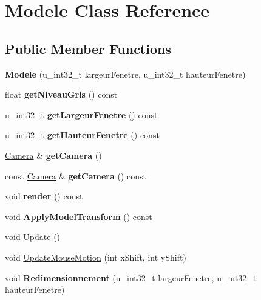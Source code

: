 \hypertarget{classModele}{}\section{Modele Class Reference}
\label{classModele}
\subsection*{Public Member Functions}
\begin{DoxyCompactItemize}
\item 
\mbox{\label{classModele_a0098c7c0f9a93ed57132232336464bd7}} 
{\bfseries Modele} (u\+\_\+int32\+\_\+t largeur\+Fenetre, u\+\_\+int32\+\_\+t hauteur\+Fenetre)
\item 
\mbox{\label{classModele_a3402dd74eb65094a7c9ebb3a47630726}} 
float {\bfseries get\+Niveau\+Gris} () const
\item 
\mbox{\label{classModele_a00323c7617ab598c5539fa11a67cc6f2}} 
u\+\_\+int32\+\_\+t {\bfseries get\+Largeur\+Fenetre} () const
\item 
\mbox{\label{classModele_a9187322e1192d147c2e5860c09a46202}} 
u\+\_\+int32\+\_\+t {\bfseries get\+Hauteur\+Fenetre} () const
\item 
\mbox{\label{classModele_ac5f88f777e3407f1e47d26836be6ab8f}} 
\mbox{\hyperlink{classCamera}{Camera}} \& {\bfseries get\+Camera} ()
\item 
\mbox{\label{classModele_af9d6fd80f9f4af067706997d1d14652d}} 
const \mbox{\hyperlink{classCamera}{Camera}} \& {\bfseries get\+Camera} () const
\item 
\mbox{\label{classModele_a14758f0a7ab9d5e8045795757883f64d}} 
void {\bfseries render} () const
\item 
\mbox{\label{classModele_aa92eee1c593dc6fae25a8147ac82eeb6}} 
void {\bfseries Apply\+Model\+Transform} () const
\item 
void \mbox{\hyperlink{classModele_a4e09a90f4eac78fa17d362fe4ff23b2f}{Update}} ()
\item 
void \mbox{\hyperlink{classModele_aef3228db18a65e19289f9c00e8684fc5}{Update\+Mouse\+Motion}} (int x\+Shift, int y\+Shift)
\item 
\mbox{\label{classModele_a9b4e3f4b2f82513214562dfb98bec7c8}} 
void {\bfseries Redimensionnement} (u\+\_\+int32\+\_\+t largeur\+Fenetre, u\+\_\+int32\+\_\+t hauteur\+Fenetre)
\end{DoxyCompactItemize}


